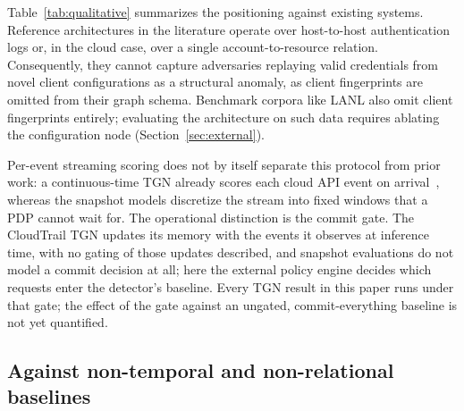 Table~\ref{tab:qualitative} summarizes the positioning against existing systems.
Reference architectures in the literature operate over host-to-host authentication logs
or, in the cloud case, over a single account-to-resource relation. Consequently, they cannot
capture adversaries replaying valid credentials from novel client configurations as a
structural anomaly, as client fingerprints are omitted from their graph schema.
Benchmark corpora like LANL also omit client fingerprints entirely; evaluating the
architecture on such data requires ablating the configuration node (Section~\ref{sec:external}).

Per-event streaming scoring does not by itself separate this protocol from prior work: a
continuous-time TGN already scores each cloud API event on arrival~\cite{cloudtrailtgn}, whereas
the snapshot models discretize the stream into fixed windows that a PDP cannot wait for. The
operational distinction is the commit gate. The CloudTrail TGN updates its memory with the
events it observes at inference time, with no gating of those updates described, and snapshot
evaluations do not model a commit decision at all; here the external policy engine decides
which requests enter the detector's baseline. Every TGN result in this paper runs under that
gate; the effect of the gate against an ungated, commit-everything baseline is not yet
quantified.

\subsection{Against non-temporal and non-relational baselines}

